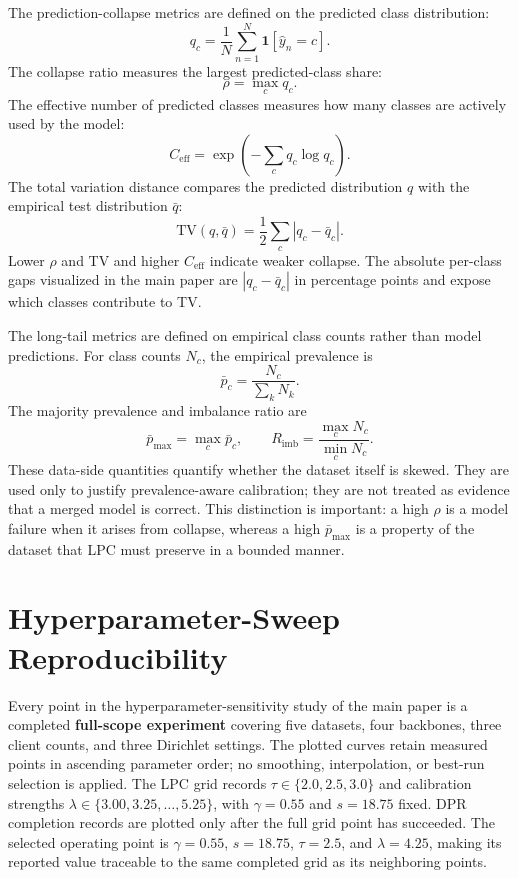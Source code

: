 \documentclass[letterpaper]{article}
\theoremstyle{definition}
\theoremstyle{plain}
\begin{document}
The prediction-collapse metrics are defined on the predicted class distribution:
\begin{equation}
q_c=\frac{1}{N}\sum_{n=1}^{N}\mathbf{1}[\hat{y}_n=c].
\end{equation}
The collapse ratio measures the largest predicted-class share:
\begin{equation}
\rho=\max_c q_c.
\end{equation}
The effective number of predicted classes measures how many classes are actively used by the model:
\begin{equation}
C_{\mathrm{eff}}=\exp\left(-\sum_c q_c\log q_c\right).
\end{equation}
The total variation distance compares the predicted distribution \(q\) with the empirical test distribution \(\bar{q}\):
\begin{equation}
\mathrm{TV}(q,\bar{q})=\frac{1}{2}\sum_c |q_c-\bar{q}_c|.
\end{equation}
Lower \(\rho\) and TV and higher \(C_{\mathrm{eff}}\) indicate weaker collapse. The absolute per-class gaps visualized in the main paper are \(|q_c-\bar{q}_c|\) in percentage points and expose which classes contribute to TV.

The long-tail metrics are defined on empirical class counts rather than model predictions. For class counts \(N_c\), the empirical prevalence is
\begin{equation}
\bar{p}_c=\frac{N_c}{\sum_k N_k}.
\end{equation}
The majority prevalence and imbalance ratio are
\begin{equation}
\bar{p}_{\max}=\max_c \bar{p}_c,\qquad
R_{\mathrm{imb}}=\frac{\max_c N_c}{\min_c N_c}.
\end{equation}
These data-side quantities quantify whether the dataset itself is skewed. They are used only to justify prevalence-aware calibration; they are not treated as evidence that a merged model is correct. This distinction is important: a high \(\rho\) is a model failure when it arises from collapse, whereas a high \(\bar{p}_{\max}\) is a property of the dataset that LPC must preserve in a bounded manner.

\section{Hyperparameter-Sweep Reproducibility}
\label{app:repro}

Every point in the hyperparameter-sensitivity study of the main paper is a completed \textbf{full-scope experiment} covering five datasets, four backbones, three client counts, and three Dirichlet settings. The plotted curves retain measured points in ascending parameter order; no smoothing, interpolation, or best-run selection is applied. The LPC grid records \(\tau\in\{2.0,2.5,3.0\}\) and calibration strengths \(\lambda\in\{3.00,3.25,\ldots,5.25\}\), with \(\gamma=0.55\) and \(s=18.75\) fixed. DPR completion records are plotted only after the full grid point has succeeded. The selected operating point is \(\gamma=0.55\), \(s=18.75\), \(\tau=2.5\), and \(\lambda=4.25\), making its reported value traceable to the same completed grid as its neighboring points.

\ifdefined\appendixinmain
\else

\end{document}
